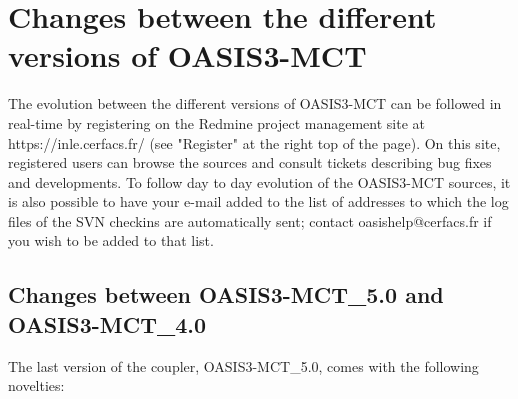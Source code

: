 \newpage

\chapter{Changes between the different versions of OASIS3-MCT}
\label{sec_changes}

The evolution between the different versions of OASIS3-MCT can be
followed in real-time by registering on the Redmine project management
site at https://inle.cerfacs.fr/ (see "Register" at the right top of
the page). On this site, registered users can browse the sources and
consult tickets describing bug fixes and developments. To follow day
to day evolution of the OASIS3-MCT sources, it is also possible to
have your e-mail added to the list of addresses to which the log files
of the SVN checkins are automatically sent; contact
oasishelp@cerfacs.fr if you wish to be added to that list.

\section{Changes between OASIS3-MCT\_5.0 and OASIS3-MCT\_4.0}

The last version of the coupler, OASIS3-MCT\_5.0, comes with the
following novelties:

